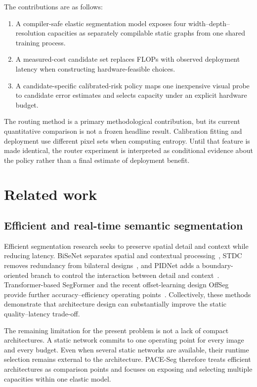 \documentclass[a4paper,review,12pt]{elsarticle}
\newcommand{\method}{PACE-Seg}
\begin{document}
The contributions are as follows:
\begin{enumerate}
    \item A compiler-safe elastic segmentation model exposes four width--depth--resolution capacities as separately compilable static graphs from one shared training process.
    \item A measured-cost candidate set replaces FLOPs with observed deployment latency when constructing hardware-feasible choices.
    \item A candidate-specific calibrated-risk policy maps one inexpensive visual probe to candidate error estimates and selects capacity under an explicit hardware budget.
\end{enumerate}

The routing method is a primary methodological contribution, but its current quantitative comparison is not a frozen headline result. Calibration fitting and deployment use different pixel sets when computing entropy. Until that feature is made identical, the router experiment is interpreted as conditional evidence about the policy rather than a final estimate of deployment benefit.

\section{Related work}
\label{sec:related}

\subsection{Efficient and real-time semantic segmentation}

Efficient segmentation research seeks to preserve spatial detail and context while reducing latency. BiSeNet separates spatial and contextual processing~\cite{yu2018bisenet}, STDC removes redundancy from bilateral designs~\cite{fan2021stdc}, and PIDNet adds a boundary-oriented branch to control the interaction between detail and context~\cite{xu2023pidnet}. Transformer-based SegFormer and the recent offset-learning design OffSeg provide further accuracy--efficiency operating points~\cite{xie2021segformer,zhang2025offseg}. Collectively, these methods demonstrate that architecture design can substantially improve the static quality--latency trade-off.

The remaining limitation for the present problem is not a lack of compact architectures. A static network commits to one operating point for every image and every budget. Even when several static networks are available, their runtime selection remains external to the architecture. \method{} therefore treats efficient architectures as comparison points and focuses on exposing and selecting multiple capacities within one elastic model.
\end{document}
